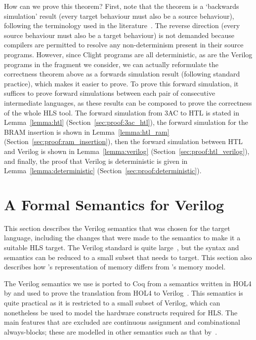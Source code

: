 How can we prove this theorem? First, note that the theorem is a `backwards
simulation' result (every target behaviour must also be a source behaviour),
following the terminology used in the \compcert{}
literature~\cite{leroy09_formal_verif_realis_compil}. The reverse direction
(every source behaviour must also be a target behaviour) is not demanded because
compilers are permitted to resolve any non-determinism present in their source
programs. However, since Clight programs are all deterministic, as are the
Verilog programs in the fragment we consider, we can actually reformulate the
correctness theorem above as a forwards simulation result (following standard
\compcert{} practice), which makes it easier to prove.  To prove this forward
simulation, it suffices to prove forward simulations between each pair of
consecutive intermediate languages, as these results can be composed to prove
the correctness of the whole HLS tool.  The forward simulation from 3AC to HTL
is stated in Lemma~\ref{lemma:htl} (Section~\ref{sec:proof:3ac_htl}), the
forward simulation for the \gls{BRAM} insertion is shown in Lemma~\ref{lemma:htl_ram}
(Section~\ref{sec:proof:ram_insertion}), then the forward simulation between HTL
and Verilog is shown in Lemma~\ref{lemma:verilog}
(Section~\ref{sec:proof:htl_verilog}), and finally, the proof that Verilog is
deterministic is given in Lemma~\ref{lemma:deterministic}
(Section~\ref{sec:proof:deterministic}).

\section{A Formal Semantics for Verilog}\label{sec:verilog}


\newcommand{\alwaysblock}{always-block}

This section describes the Verilog semantics that was chosen for the target language, including the changes that were made to the semantics to make it a suitable HLS target.  The Verilog standard is quite large~\cite{06_ieee_stand_veril_hardw_descr_languag,05_ieee_stand_veril_regis_trans_level_synth}, but the syntax and semantics can be reduced to a small subset that \vericert{} needs to target.  This section  also describes how \vericert{}'s representation of memory differs from \compcert{}'s memory model.

The Verilog semantics we use is ported to Coq from a semantics written in HOL4 by \textcite{lööw19_proof_trans_veril_devel_hol} and used to prove the translation from HOL4 to Verilog~\cite{lööw19_verif_compil_verif_proces}. %
This semantics is quite practical as it is restricted to a small subset of Verilog, which can nonetheless be used to model the hardware constructs required for HLS.  The main features that are excluded are continuous assignment and combinational \alwaysblock{}s; these are modelled in other semantics such as that by~\textcite{meredith10_veril}. %

